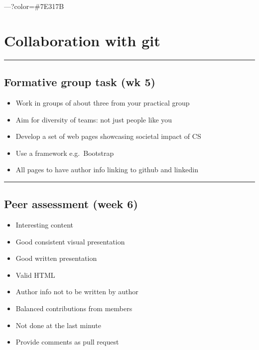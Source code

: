 ---?color=\#7E317B

\hypertarget{collaboration-with-git}{%
\section{Collaboration with git}\label{collaboration-with-git}}

\begin{center}\rule{0.5\linewidth}{\linethickness}\end{center}

\hypertarget{formative-group-task-wk-5}{%
\subsection{Formative group task (wk
5)}\label{formative-group-task-wk-5}}

\begin{itemize}
\tightlist
\item
  Work in groups of about three from your practical group
\item
  Aim for diversity of teams: not just people like you
\item
  Develop a set of web pages showcasing societal impact of CS
\item
  Use a framework e.g.~Bootstrap
\item
  All pages to have author info linking to github and linkedin
\end{itemize}

\begin{center}\rule{0.5\linewidth}{\linethickness}\end{center}

\hypertarget{peer-assessment-week-6}{%
\subsection{Peer assessment (week 6)}\label{peer-assessment-week-6}}

\begin{itemize}
\tightlist
\item
  Interesting content
\item
  Good consistent visual presentation
\item
  Good written presentation
\item
  Valid HTML
\item
  Author info not to be written by author
\item
  Balanced contributions from members
\item
  Not done at the last minute
\item
  Provide comments as pull request
\end{itemize}


